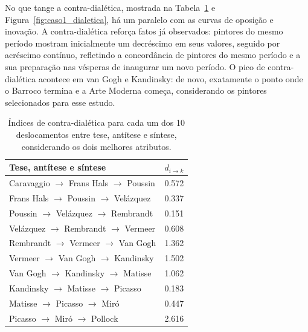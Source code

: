 No que tange a contra-dialética, mostrada na
Tabela~\ref{tab:dialetica1} e Figura~\ref{fig:caso1_dialetica}, há um
paralelo com as curvas de oposição e inovação. A contra-dialética
reforça fatos já observados: pintores do mesmo período mostram
inicialmente um decréscimo em seus valores, seguido por acréscimo
contínuo, refletindo a concordância de pintores do mesmo período e a
sua preparação nas vésperas de inaugurar um novo período. O pico de
contra-dialética acontece em van Gogh e Kandinsky: de novo, exatamente
o ponto onde o Barroco termina e a Arte Moderna começa, considerando
os pintores selecionados para esse estudo.

\begin{table}[ht]
  \begin{center}
  \caption{\label{tab:dialetica1} Índices de contra-dialética para cada um dos
    10 deslocamentos entre tese, antítese e síntese, considerando os dois
    melhores atributos.}
\begin{tabular}{@{}ll}
  
    \hline \hline
    Tese, antítese e síntese & $d_{i \rightarrow k}$ \\
    \hline
    Caravaggio $\to$ Frans Hals $\to$ Poussin   & 0.572 \\
    Frans Hals $\to$ Poussin $\to$ Vel\'{a}zquez & 0.337 \\
    Poussin $\to$ Vel\'{a}zquez $\to$ Rembrandt  & 0.151 \\
    Vel\'{a}zquez $\to$ Rembrandt $\to$ Vermeer  & 0.608 \\
    Rembrandt $\to$ Vermeer $\to$ Van Gogh      & 1.362 \\
    Vermeer $\to$ Van Gogh $\to$ Kandinsky      & 1.502 \\
    Van Gogh $\to$ Kandinsky $\to$ Matisse      & 1.062 \\
    Kandinsky $\to$ Matisse $\to$ Picasso       & 0.183 \\
    Matisse $\to$ Picasso $\to$ Mir\'{o}         & 0.447 \\
    Picasso $\to$ Mir\'{o} $\to$ Pollock         & 2.616 \\
    \hline \hline
  \end{tabular}
\end{center}
\end{table}


